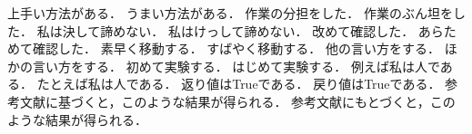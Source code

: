 上手い方法がある．
うまい方法がある．
作業の分担をした．
作業のぶん坦をした．
私は決して諦めない．
私はけっして諦めない．
改めて確認した．
あらためて確認した．
素早く移動する．
すばやく移動する．
他の言い方をする．
ほかの言い方をする．
初めて実験する．
はじめて実験する．
例えば私は人である．
たとえば私は人である．
返り値はTrueである．
戻り値はTrueである．
参考文献に基づくと，このような結果が得られる．
参考文献にもとづくと，このような結果が得られる．